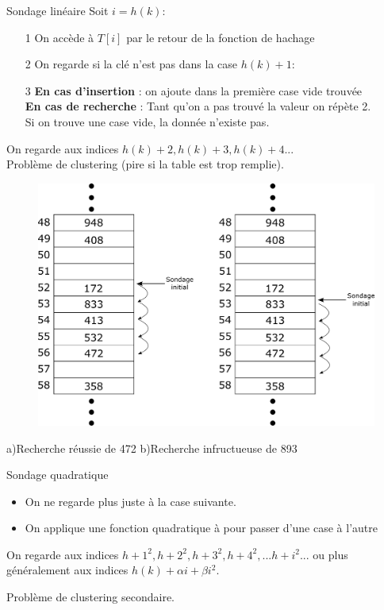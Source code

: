 \documentclass[12pt,a4paper]{beamer}
\begin{document}
\begin{frame}{Sondage linéaire}
Soit $i = h(k)$:

\begin{itemize}
\item[1] On accède à $T[i]$ par le retour de la fonction de hachage
\item[2] On regarde si la clé n'est pas dans la case $h(k)+1$:
\item[3] \textbf{En cas d'insertion} : on ajoute dans la première case vide trouvée\\
\textbf{En cas de recherche} : Tant qu'on a pas trouvé la valeur on répète 2.\\
Si on trouve une case vide, la donnée n'existe pas.
\end{itemize}
On regarde aux indices $h(k)+2, h(k)+3, h(k)+4...$\\
\vspace{1em}
\pause \Frowny Problème de clustering (pire si la table est trop remplie).
\end{frame}

\begin{frame}
\begin{figure}
\includegraphics[scale=0.3]{figs/ht_linear}
\end{figure}
\hspace{-1em}a)Recherche réussie de 472  \hspace{1em}  b)Recherche infructueuse de 893
\end{frame}

\begin{frame}{Sondage quadratique}

\begin{itemize}
\item On ne regarde plus juste à la case suivante.
\item On applique une fonction quadratique à pour passer d'une case à l'autre
\end{itemize}

On regarde aux indices $h+1^2, h+2^2, h+3^2, h+4^2,...  h+i^2 ...$ ou plus
généralement aux indices $h(k) + \alpha i + \beta i^2$.

\pause \Frowny Problème de clustering secondaire.

\end{frame}
\end{document}
